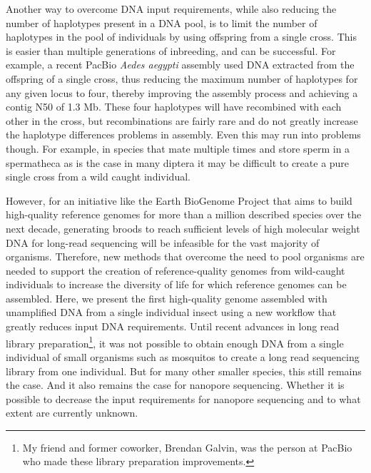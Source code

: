 \par{
Another way to overcome DNA input requirements, while also reducing the number of haplotypes present in a DNA pool, is to limit the number of haplotypes in the pool of individuals by using offspring from a single cross. This is easier than multiple generations of inbreeding, and can be successful. For example, a recent PacBio \textit{Aedes aegypti} assembly used DNA extracted from the offspring of a single cross, thus reducing the maximum number of haplotypes for any given locus to four, thereby improving the assembly process and achieving a contig N50 of 1.3 Mb\cite{Matthews2018-th}. These four haplotypes will have recombined with each other in the cross, but recombinations are fairly rare and do not greatly increase the haplotype differences problems in assembly. Even this may run into problems though. For example, in species that mate multiple times and store sperm in a spermatheca as is the case in many diptera\cite{spermatheca}\cite{polyandry} it may be difficult to create a pure single cross from a wild caught individual.
} 

\par{
However, for an initiative like the Earth BioGenome Project\cite{Lewin2018-lc} that aims to build high-quality reference genomes for more than a million described species over the next decade, generating broods to reach sufficient levels of high molecular weight DNA for long-read sequencing will be infeasible for the vast majority of organisms. Therefore, new methods that overcome the need to pool organisms are needed to support the creation of reference-quality genomes from wild-caught individuals to increase the diversity of life for which reference genomes can be assembled. Here, we present the first high-quality genome assembled with unamplified DNA from a single individual insect using a new workflow that greatly reduces input DNA requirements. Until recent advances in long read library preparation\footnote{My friend and former coworker, Brendan Galvin, was the person at PacBio who made these library preparation improvements.}\cite{mosquito_assembly}, it was not possible to obtain
enough DNA from a single individual of small organisms such as mosquitos to create a long read sequencing library from one individual. 
But for many other smaller species, this still remains the case. And it also remains the case for nanopore sequencing. 
Whether it is possible to decrease the input requirements for nanopore sequencing and to what extent are currently unknown.  
} 

